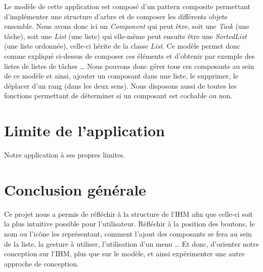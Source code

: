 \documentclass[a4paper,10pt]{article}
\begin{document}
Le modèle de cette application est composé d'un pattern composite permettant d'implémenter une structure d'arbre et de composer les différents objets ensemble.
Nous avons donc ici un \textit{Component} qui peut être, soit une \textit{Task} (une tâche), soit une \textit{List} (une liste) qui elle-même peut ensuite être
une \textit{SortedList} (une liste ordonnée), celle-ci hérite de la classe \textit{List}. Ce modèle permet donc comme expliqué ci-dessus de composer ces
éléments et d'obtenir par exemple des listes de listes de tâches \dots 
Nous pouvons donc gérer tous ces composants au sein de ce modèle et ainsi, ajouter un composant dans une liste, le supprimer, le déplacer d'un rang
(dans les deux sens). Nous disposons aussi de toutes les fonctions permettant de déterminer si un composant est cochable ou non.

\newpage
\section{Limite de l'application}
Notre application à ses propres limites.

\newpage
\section{Conclusion générale}
Ce projet nous a permis de réfléchir à la structure de l'IHM afin que celle-ci soit la plus intuitive possible pour l'utilisateur. Réfléchir à la position des
boutons, le nom ou l'icône les représentant, comment l'ajout des composants se fera au sein de la liste, la gesture à utiliser, l'utilisation d'un menu \ldots{}
Et donc, d'orienter notre conception sur l'IHM, plus que sur le modèle, et ainsi expérimenter une autre approche de conception.
\end{document}
